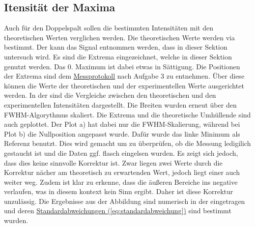 \subsection{Itensität der Maxima}
Auch für den Doppelspalt sollen die bestimmten Intensitäten mit den theoretischen Werten verglichen werden. Die theoretischen Werte werden via  bestimmt. Der  kann das Signal entnommen werden, dass in dieser Sektion untersuch wird. Es sind die Extrema eingezeichnet, welche in dieser Sektion genutzt werden. Das 0. Maximum ist dabei etwas in Sättigung.
Die Positionen der Extrema sind dem \hyperref[ch:Protokoll]{Messprotokoll} nach Aufgabe 3 zu entnehmen. Über diese können die Werte der theoretischen und der experimentellen Werte ausgerichtet werden.
In der  sind die Vergleiche zwischen den theoretischen und den experimentellen Intensitäten dargestellt. Die Breiten wurden erneut über den FWHM-Algorythmus skaliert. 
Die Extrema und die theoretische Umhüllende sind auch geplottet. 
Der Plot a) hat dabei nur die FWHM-Skalierung, während bei Plot b) die Nullposition angepasst wurde. Dafür wurde das linke Minimum als Referenz benutzt. Dies wird gemacht um zu überprüfen, ob die Messung ledigilich gestaucht ist und die Daten ggf. flasch eingelsen wurden.
Es zeigt sich jedoch, dass dies keine sinnvolle Korrektur ist. Zwar liegen zwei Werte durch die Korrektur nächer am theoretisch zu erwartenden Wert, jedoch liegt einer auch weiter weg. Zudem ist klar zu erkenne, dass die äußeren Bereiche ins negative verlaufen, was in diesem kontext kein Sinn ergibt. Daher ist diese Korrektur unzulässig.
Die Ergebnisse aus der Abbildung sind numerisch in der  eingetragen und deren \hyperref[eq:standardabweichung]{Standardabweichungen (\ref*{eq:standardabweichung})} sind bestimmt wurden.


